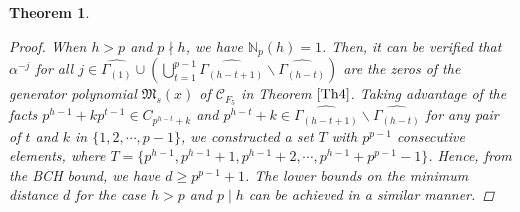 \documentclass[pdflatex,sn-mathphys-num]{sn-jnl}%
\theoremstyle{thmstyleone}%
\newtheorem{theorem}{Theorem}%
\theoremstyle{thmstyletwo}%
\theoremstyle{thmstylethree}%
\begin{document}
\begin{theorem}
\begin{proof}
 \par When $h>p$ and $p\nmid h$, we have $\mathbb{N}_{p}(h)=1$. Then, it can be verified that $\alpha^{-j}$ for all $j\in\widehat{\Gamma_{(1)}}\cup\left(\bigcup_{t=1}^{p-1}\widehat{\Gamma_{(h-t+1)}}\backslash\widehat{\Gamma_{(h-t)}}\right)$ are the zeros of the generator polynomial $\mathfrak{M}_{s}(x)$ of $\mathcal{C}_{F_{5}}$ in Theorem $\ref{Th4}$. Taking advantage of the facts $p^{h-1}+kp^{t-1}\in C_{p^{h-t}+k}$ and $p^{h-t}+k\in\widehat{\Gamma_{(h-t+1)}}\backslash\widehat{\Gamma_{(h-t)}}$ for any pair of $t$ and $k$ in $\{1,2,\cdots,p-1\}$, we constructed a set $T$ with $p^{p-1}$ consecutive elements, where $T=\{p^{h-1},p^{h-1}+1,p^{h-1}+2,\cdots,p^{h-1}+p^{p-1}-1\}$. Hence, from the BCH bound, we have $d\geq p^{p-1}+1$. The lower bounds on the minimum distance $d$ for the case $h>p$ and $p\mid h$ can be achieved in a similar manner.    \end{proof}
\end{theorem}
\end{document}
